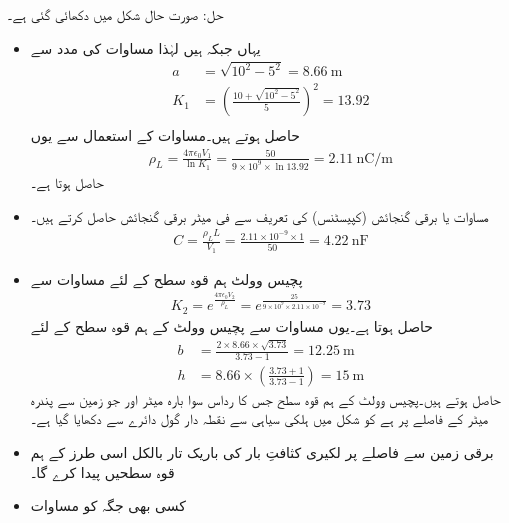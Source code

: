 حل: صورت حال شکل  میں دکھائی گئی ہے۔
\begin{itemize}
\item
یہاں  جبکہ  ہیں لہٰذا مساوات  کی مدد سے
\begin{align*}
a&=\sqrt{10^2-5^2}=\SI{8.66}{\meter}\\
K_1&=\left(\frac{10+\sqrt{10^2-5^2}}{5}\right)^2=13.92\\
\end{align*}
حاصل ہوتے ہیں۔مساوات  کے استعمال سے یوں
\begin{align*}
\rho_L=\frac{4\pi\epsilon_0 V_1}{\ln K_1}=\frac{50}{9 \times 10^9 \times \ln 13.92}=\SI{2.11}{\nano \coulomb \per \meter}
\end{align*}
حاصل ہوتا ہے۔
\item
مساوات  یا برقی گنجائش (کپیسٹنس) کی تعریف سے فی میٹر برقی گنجائش حاصل کرتے ہیں۔
\begin{align*}
C=\frac{\rho_L L}{V_1} =\frac{2.11 \times 10^{-9} \times 1}{50}=\SI{4.22}{\nano \farad }
\end{align*}
\item
پچیس وولٹ ہم قوہ سطح کے لئے مساوات  سے 
\begin{align*}
K_2=e^{\frac{4\pi\epsilon_0 V_2}{\rho_L}}=e^{\frac{25}{9\times 10^9 \times 2.11 \times 10^{-9}}}=3.73
\end{align*}
حاصل ہوتا ہے۔یوں مساوات  سے پچیس وولٹ کے ہم قوہ سطح کے لئے
\begin{align*}
b&=\frac{2\times 8.66 \times \sqrt{3.73}}{3.73-1}=\SI{12.25}{\meter}\\
h&=8.66 \times \left(\frac{3.73+1}{3.73-1} \right)=\SI{15}{\meter}
\end{align*}
حاصل ہوتے ہیں۔پچیس وولٹ کے ہم قوہ سطح جس کا رداس سوا بارہ میٹر اور جو زمین سے پندرہ میٹر کے فاصلے پر ہے  کو شکل میں ہلکی سیاہی سے نقطہ دار گول دائرے سے دکھایا گیا ہے۔
\item
برقی زمین سے   فاصلے پر  لکیری کثافتِ بار کی باریک تار بالکل اسی طرز کے ہم قوہ سطحیں پیدا کرے گا۔ 
\item
کسی بھی جگہ  کو مساوات 


\end{itemize}

